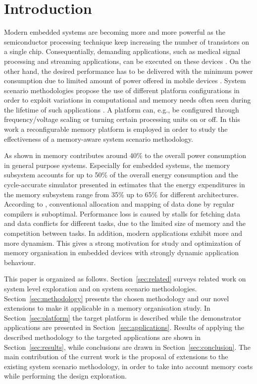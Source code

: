 \section{Introduction}
\label{sec:introduction}

Modern embedded systems are becoming more and more powerful as the semiconductor processing technique keep increasing the number of transistors on a single chip. Consequentially, demanding applications, such as medical signal processing and streaming applications, can be executed on these devices \cite{narasinga}. On the other hand, the desired performance has to be delivered with the minimum power consumption due to limited amount of power offered in mobile devices \cite{tcm}. System scenario methodologies propose the use of different platform configurations in order to exploit variations in computational and memory needs often seen during the lifetime of such applications \cite{tcm}. A platform can, e.g., be configured through frequency/voltage scaling or turning certain processing units on or off. In this work a reconfigurable memory platform is employed in order to study the effectiveness of a memory-aware system scenario methodology.

As shown in \cite{Gonzalez1996} memory contributes around 40\% to the overall power consumption in general purpose systems. Especially for embedded systems, the memory subsystem accounts for up to 50\% of the overall energy consumption \cite{Che09} and the cycle-accurate simulator presented in \cite{Ben99} estimates that the energy expenditures in the memory subsystem range from 35\% up to 65\% for different architectures. According to \cite{tcm}, conventional allocation and mapping of data done by regular compilers is suboptimal. Performance loss is caused by stalls for fetching data and data conflicts for different tasks, due to the limited size of memory and the competition between tasks. In addition, modern applications exhibit more and more dynamism. This gives a strong motivation for study and optimization of memory organisation in embedded devices with strongly dynamic application behaviour.

This paper is organized as follows. Section~\ref{sec:related} surveys related work on system level exploration and on system scenario methodologies. Section~\ref{sec:methodology} presents the chosen methodology and our novel extensions to make it applicable in a memory organisation study. In Section~\ref{sec:platform} the target platform is described while the demonstrator applications are presented in Section~\ref{sec:applications}. Results of applying the described methodology to the targeted applications are shown in Section~\ref{sec:results}, while conclusions are drawn in Section~\ref{sec:conclusion}. The main contribution of the current work is the proposal of extensions to the existing system scenario methodology, in order to take into account memory costs while performing the design exploration.  

